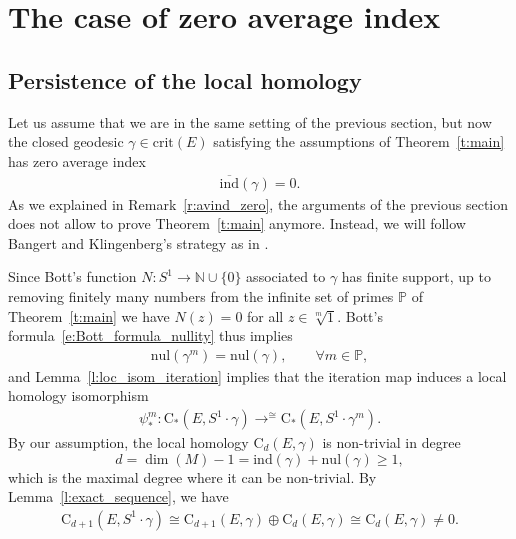 \documentclass[reqno]{amsart}
\numberwithin{equation}{section}
\theoremstyle{personal}%
\theoremstyle{definition}
\newcommand{\N}{\mathds{N}}
\newcommand{\PP}{\mathds{P}}
\newcommand{\crit}{\mathrm{crit}}
\newcommand{\Loc}{\mathrm{C}}
\newcommand{\avind}{\overline{\ind}}
\newcommand{\ind}{\mathrm{ind}}
\newcommand{\nul}{\mathrm{nul}}
\DeclareMathOperator*{\toup}{\longrightarrow}
\begin{document}
\section{The case of zero average index}
\label{s:avind_zero}

\subsection{Persistence of the local homology}
Let us assume that we are in the same setting of the previous section, but now the closed geodesic $\gamma\in\crit(E)$ satisfying the assumptions of Theorem~\ref{t:main} has zero average index
\begin{align*}
 \avind(\gamma)=0.
\end{align*}
As we explained in Remark~\ref{r:avind_zero}, the arguments of the previous section does not allow to prove Theorem~\ref{t:main} anymore. Instead, we will follow Bangert and Klingenberg's strategy as in \cite{Bangert:1983ax}.

Since  Bott's function $N:S^1\to\N\cup\{0\}$ associated to $\gamma$ has finite support, up to removing finitely many numbers from the infinite set of primes $\PP$ of Theorem~\ref{t:main} we have $N(z)=0$ for all $z\in\sqrt[m]1$. Bott's formula~\eqref{e:Bott_formula_nullity} thus implies
\begin{align*}
 \nul(\gamma^m)=\nul(\gamma),
 \qquad
 \forall m\in\PP,
\end{align*}
and Lemma~\ref{l:loc_isom_iteration} implies that the iteration map induces a local homology isomorphism
\begin{align*}
\psi^m_*: \Loc_*(E,S^1\cdot\gamma) \toup^{\cong} \Loc_*(E,S^1\cdot\gamma^m).
\end{align*}
By our assumption, the local homology $\Loc_d(E,\gamma)$ is non-trivial in degree 
\[
d=\dim(M)-1=\ind(\gamma)+\nul(\gamma)\geq1,
\] 
which is the maximal degree where it can be non-trivial. By Lemma~\ref{l:exact_sequence}, we have
\begin{align*}
 \Loc_{d+1}(E,S^1\cdot\gamma) 
 \cong
 \Loc_{d+1}(E,\gamma) \oplus  \Loc_{d}(E,\gamma) 
 \cong
 \Loc_{d}(E,\gamma)\neq 0.
\end{align*}
\end{document}
